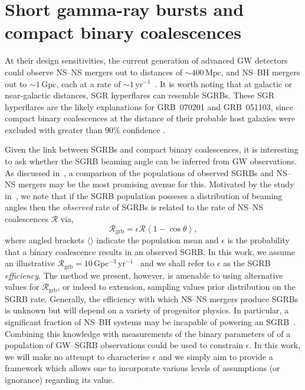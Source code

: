 \documentclass[twocolumn,nofootinbib]{revtex4-1}
\newcommand{\grbrate}{{{\mathcal R}_{\mathrm{grb}}}}
\newcommand{\cbcrate}{{{\mathcal R}}}
\newcommand{\mpc}{\mathrm{Mpc}}
\newcommand{\BNS}{\ac{NS}--\ac{NS}\xspace}
\newcommand{\NSBH}{\ac{NS}--\ac{BH}\xspace}
\newcommand{\JOINT}{\ac{GW}--\ac{SGRB}\xspace}
\begin{document}
\section{Short gamma-ray bursts and compact binary coalescences}
\label{sec:sgrbs}
At their design sensitivities, the current generation of advanced
\ac{GW} detectors could observe \BNS mergers out to distances of
$\sim 400\,\mpc$, and \NSBH mergers out to $\sim 1\,$Gpc, each at a rate of
$\sim 1\,$yr$^{-1}$~\cite{Aasi:2013wya}. It is worth noting that at
galactic or near-galactic distances, \ac{SGR} hyperflares can resemble
\acp{SGRB}. These \ac{SGR} hyperflares are the likely explanations
for GRB~070201 and GRB~051103, since compact binary coalescences at
the distance of their probable host galaxies were excluded with
greater than $90\%$ confidence \cite{Abbott:2007rh,Abadie:2012bz}.

Given the link between \acp{SGRB} and compact binary coalescences, it is
interesting to ask whether the \ac{SGRB} beaming angle can be inferred from
\ac{GW} observations. As discussed in~\cite{Clark:2014jpa}, a comparison of
the populations of observed \acp{SGRB} and \BNS mergers may be the most
promising avenue for this. Motivated by the study in~\cite{Chen:2012qh},
we note that if the \ac{SGRB} population posseses a distribution of beaming
angles then the \emph{observed} rate of \acp{SGRB} is related to the rate of
\BNS coalescences $\cbcrate$ via,
%
\begin{equation}\label{eq:rate2angle}
    \grbrate = \epsilon\cbcrate \left \langle 1-\cos \theta \right \rangle,
\end{equation}
%
where angled brackets $\langle \rangle$ indicate the population mean
and $\epsilon$ is the probability that a binary coalescence results in
an observed \ac{SGRB}.  In this work, we assume an illustrative
$\grbrate=10$\,Gpc$^{-3}$\,yr$^{-1}$~\cite{Nakar:2007yr,Dietz:2010eh}
and we shall refer to $\epsilon$ as the \ac{SGRB}
\emph{efficiency}. The method we present, however, is amenable to
using alternative values for $\grbrate$, or indeed to extension,
sampling values prior distribution on the \ac{SGRB} rate.  Generally,
the efficiency with which \BNS mergers produce \acp{SGRB} is unknown
but will depend on a variety of progenitor physics.  In particular, a
significant fraction of \NSBH systems may be incapable of powering an
\ac{SGRB}~\cite{Pannarale:2014rea}.  Combining this knowledge with
measurements of the binary parameters of of a population of \JOINT
observations could be used to constrain $\epsilon$.  In this work, we
will make no attempt to characterise $\epsilon$ and we simply aim to
provide a framework which allows one to incorporate various levels of
assumptions (or ignorance) regarding its value.
\end{document}
